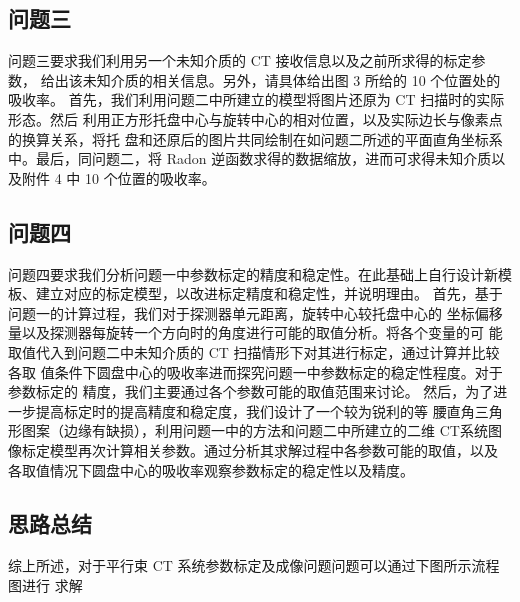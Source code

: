 \documentclass[bwprint]{cumcmthesis}
\begin{document}
\subsection{问题三}
问题三要求我们利用另一个未知介质的 CT 接收信息以及之前所求得的标定参数， 给出该未知介质的相关信息。另外，请具体给出图 3 所给的 10 个位置处的吸收率。 首先，我们利用问题二中所建立的模型将图片还原为 CT 扫描时的实际形态。然后 利用正方形托盘中心与旋转中心的相对位置，以及实际边长与像素点的换算关系，将托 盘和还原后的图片共同绘制在如问题二所述的平面直角坐标系中。最后，同问题二，将 Radon 逆函数求得的数据缩放，进而可求得未知介质以及附件 4 中 10 个位置的吸收率。

\subsection{问题四}
问题四要求我们分析问题一中参数标定的精度和稳定性。在此基础上自行设计新模 板、建立对应的标定模型，以改进标定精度和稳定性，并说明理由。 首先，基于问题一的计算过程，我们对于探测器单元距离，旋转中心较托盘中心的 坐标偏移量以及探测器每旋转一个方向时的角度进行可能的取值分析。将各个变量的可 能取值代入到问题二中未知介质的 CT 扫描情形下对其进行标定，通过计算并比较各取 值条件下圆盘中心的吸收率进而探究问题一中参数标定的稳定性程度。对于参数标定的 精度，我们主要通过各个参数可能的取值范围来讨论。 然后，为了进一步提高标定时的提高精度和稳定度，我们设计了一个较为锐利的等 腰直角三角形图案（边缘有缺损），利用问题一中的方法和问题二中所建立的二维 CT系统图像标定模型再次计算相关参数。通过分析其求解过程中各参数可能的取值，以及 各取值情况下圆盘中心的吸收率观察参数标定的稳定性以及精度。
\subsection{思路总结}
综上所述，对于平行束 CT 系统参数标定及成像问题问题可以通过下图所示流程图进行 求解

\end{document}
